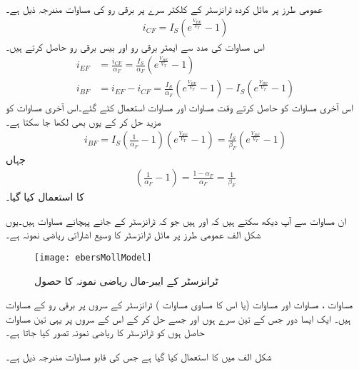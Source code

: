عمومی طرز پر مائل کردہ  ٹرانزسٹر کے کلکٹر  سرے پر برقی رو کی مساوات مندرجہ ذیل ہے۔
\begin{align} \label{مساوات_ٹرانزسٹر_کلکٹر _سیدھی_رو}
i_{CF}=I_S \left (e^{\frac{V_{BE}}{V_T}}-1 \right )
\end{align}
اس مساوات کی مدد سے ایمٹر برقی رو   اور بیس برقی رو  حاصل کرتے ہیں۔
\begin{align}
i_{EF}&=\frac{i_{CF}}{\alpha_F}=\frac{I_S}{\alpha_F} \left (e^{\frac{V_{BE}}{V_T}}-1 \right ) 
\label{مساوات_ٹرانزسٹر_مخارج_سیدھی_رو}  \\
i_{BF}&=i_{EF}-i_{CF}=\frac{I_S}{\alpha_F} \left (e^{\frac{V_{BE}}{V_T}}-1 \right )-I_S \left (e^{\frac{V_{BE}}{V_T}}-1 \right ) \label{مساوات_ٹرانزسٹر_قابو_سیدھی_رو_الف}
\end{align}
اس آخری مساوات کو حاصل کرتے وقت مساوات   اور مساوات   استعمال کئے گئے۔اس آخری مساوات کو مزید حل کر کے یوں بھی لکھا جا سکتا ہے۔
\begin{align} \label{مساوات_ٹرانزسٹر_قابو_سیدھی_رو}
i_{BF}=I_S \left (\frac{1}{\alpha_F}-1 \right ) \left (e^{\frac{V_{BE}}{V_T}}-1 \right )=\frac{I_S}{\beta_F} \left (e^{\frac{V_{BE}}{V_T}}-1 \right )
\end{align}
جہاں
\begin{align}
\left (\frac{1}{\alpha_F}-1 \right )=\frac{1-\alpha_F}{\alpha_F}=\frac{1}{\beta_F}
\end{align}
کا استعمال کیا گیا۔

ان مساوات سے آپ دیکھ سکتے ہیں کہ اور ہیں جو کہ ٹرانزسٹر کے جانے پہچانے مساوات ہیں۔یوں شکل  الف عمومی طرز پر مائل   ٹرانزسٹر کا وسیع اشاراتی ریاضی نمونہ  ہے۔
\begin{figure}
\centering
\texttt{[image: ebersMollModel]}
\caption{ ٹرانزسٹر کے ایبر-مال ریاضی نمونہ  کا حصول}
\label{شکل_ایبر_مال_ماڈل}
\end{figure}
مساوات  ، مساوات   اور مساوات   (یا اس کا مساوی مساوات   ) ٹرانزسٹر کے سروں پر برقی رو کے مساوات ہیں۔ ایک ایسا دور جس کے تین سرے ہوں اور جسے حل کر کے اس کے سروں پر یہی تین مساوات حاصل ہوں کو ٹرانزسٹر کا ریاضی نمونہ  تصور کیا جاتا ہے۔

شکل  الف میں   کا استعمال کیا گیا ہے جس کی قابو مساوات مندرجہ ذیل ہے۔

